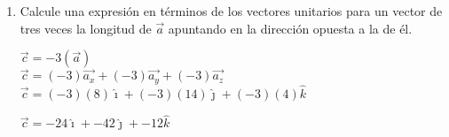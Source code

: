 \documentclass[10pt, a4paper]{article}
\begin{document}
\begin{enumerate}
\begin{enumerate}
            \begin{center}
            \end{center}

            \item Calcule una expresión en términos de los vectores unitarios para un vector de
            tres veces la longitud de $\vec{a}$ apuntando en la dirección opuesta a la de él.

            \begin{center}
                $\vec{c}= -3(\vec{a})$\\
                $\vec{c}= (-3)\vec{a_x}+(-3)\vec{a_y}+(-3)\vec{a_z}$\\
                $\vec{c}= (-3)(8)\hat\imath + (-3)(14)\hat\jmath + (-3)(4)\hat{k}$

                $\vec{c}= -24\hat\imath + -42\hat\jmath + -12\hat{k}$
            \end{center}


\end{enumerate}
\end{enumerate}
\end{document}
